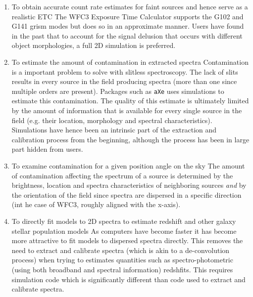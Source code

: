 \documentclass[preprint]{aastex}
\begin{document}
\begin{enumerate}
\item To obtain accurate count rate estimates for faint sources and hence serve as a realistic ETC
The WFC3 Exposure Time Calculator supports the G102 and G141 grism modes but does so in an approximate manner. Users have found in the past that to account for the signal delusion that occurs with different object morphologies, a full 2D simulation is preferred. 

\item To estimate the amount of contamination in extracted spectra
Contamination is a important problem to solve with slitless spectroscopy. The lack of slits results in every source in the field producing spectra (more than one since multiple orders are present). Packages such as \texttt{aXe} uses simulations to estimate this contamination. The quality of this estimate is ultimately limited by the amount of information that is available for every single source in the field (e.g. their location, morphology and spectral characteristics). Simulations have hence been an intrinsic part of the extraction and calibration process from the beginning, although the process has been in large part hidden from users.

\item To examine contamination for a given position angle on the sky 
The amount of contamination affecting  the spectrum of a source is determined by the brightness, location and spectra characteristics of neighboring sources {\em and} by the orientation of the field since spectra are dispersed in a specific direction (int he case of WFC3, roughly aligned with the x-axis).

\item To directly fit models to 2D spectra to estimate redshift and other galaxy stellar population models
As computers have become faster it has become more attractive to fit models to dispersed spectra directly. This removes the need to extract and calibrate spectra (which is akin to a de-convolution process) when trying to estimates quantities such as spectro-photometric (using both broadband and spectral information) redshfits. This requires simulation code which is significantly different than code used to extract and calibrate spectra.

\end{enumerate}


\end{document}
